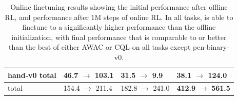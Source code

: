 \begin{table}
\begin{tabular}{ l ||p{1.5cm} |p{1.5cm} | p{1.5cm}  }
    hand-v0 total & \textbf{46.7} \; $\rightarrow$ 103.1 & 31.5 \; $\rightarrow$ 9.9 & 38.1 \; $\rightarrow$ \textbf{124.0} \\ \hline \hline
    total & 154.4 $\rightarrow$ 211.4 & 182.8 $\rightarrow$ 241.0 & \textbf{412.9} $\rightarrow$ \textbf{561.5}
\end{tabular}
\caption{Online finetuning results showing the initial performance after offline RL, and performance after 1M steps of online RL. In all tasks, \ourname is able to finetune to a significantly higher performance than the offline initialization, with final performance that is comparable to or better than the best of either AWAC or CQL on all tasks except pen-binary-v0.}
\label{tab:finetuning}
\end{table}

